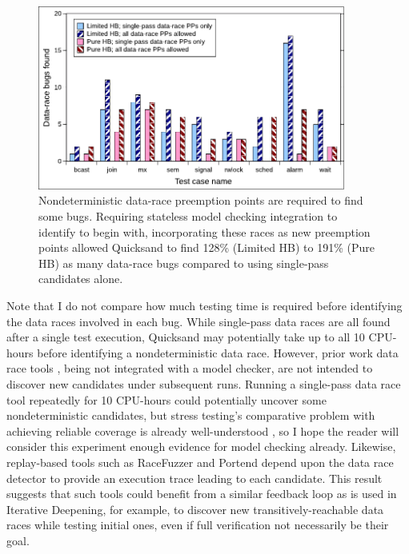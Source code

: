 \begin{figure}[t]
	\begin{center}
	\includegraphics[width=0.9\textwidth]{../proposal/nondets.pdf} %
	\end{center}
	\caption[Nondeterministic data-race preemption points are required to find some bugs.]
	{Nondeterministic data-race preemption points are required to find some bugs.
	Requiring stateless model checking integration to identify to begin with,
	incorporating these races as new preemption points
	allowed Quicksand to find
	128\% (Limited HB) to 191\% (Pure HB) as many data-race bugs
	compared to using single-pass candidates alone.
	}
	\label{fig:dr-falsenegs}
\end{figure}

Note that I do not compare how much testing time is required before identifying the data races %
involved in each bug.
While single-pass data races are all found after a single test execution,
Quicksand may potentially take up to all 10 CPU-hours before identifying a nondeterministic data race.
However, prior work data race tools \cite{tsan,fasttrack},
being not integrated with a model checker,
are not intended to discover new candidates under subsequent runs.
Running a single-pass data race tool repeatedly for 10 CPU-hours could potentially uncover some nondeterministic candidates,
but stress testing's comparative problem with achieving reliable coverage is already well-understood
\cite{chess-icb,gambit},
so I hope the reader will consider this experiment enough evidence for model checking already.
Likewise, replay-based tools such as RaceFuzzer \cite{racefuzzer} and Portend \cite{portend}
depend upon the data race detector to provide an execution trace leading to each candidate.
This result suggests that
such tools could benefit from a similar feedback loop as is used in Iterative Deepening,
for example, to discover new transitively-reachable data races while testing initial ones,
even if full verification not necessarily be their goal.

